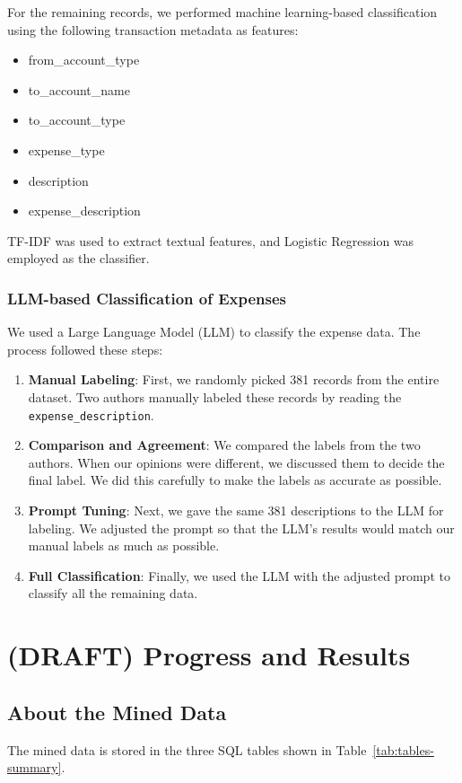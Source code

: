 \documentclass[11pt]{ist-thesis-lt}
\begin{document}
For the remaining records, we performed machine learning-based classification using the following transaction metadata as features:

\begin{itemize}
\item from\_account\_type
\item to\_account\_name
\item to\_account\_type
\item expense\_type
\item description
\item expense\_description
\end{itemize}

TF-IDF was used to extract textual features, and Logistic Regression was employed as the classifier.

\subsubsection{LLM-based Classification of Expenses}

We used a Large Language Model (LLM) to classify the expense data. The process followed these steps:

\begin{enumerate}
    \item \textbf{Manual Labeling}: First, we randomly picked 381 records from the entire dataset. Two authors manually labeled these records by reading the \texttt{expense\_description}.
    \item \textbf{Comparison and Agreement}: We compared the labels from the two authors. When our opinions were different, we discussed them to decide the final label. We did this carefully to make the labels as accurate as possible.
    \item \textbf{Prompt Tuning}: Next, we gave the same 381 descriptions to the LLM for labeling. We adjusted the prompt so that the LLM's results would match our manual labels as much as possible.
    \item \textbf{Full Classification}: Finally, we used the LLM with the adjusted prompt to classify all the remaining data.
\end{enumerate}

\section{(DRAFT) Progress and Results}

\subsection{About the Mined Data}
The mined data is stored in the three SQL tables shown in Table~\ref{tab:tables-summary}.
\end{document}
